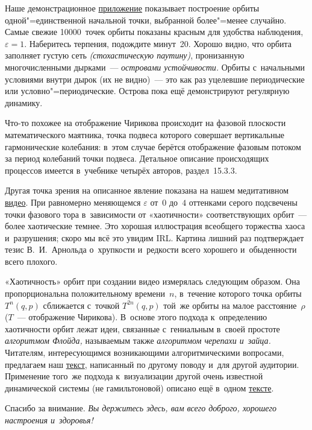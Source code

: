 \documentclass[a4paper,11pt]{article}
\theoremstyle{definition}
\begin{document}
Наше демонстрационное
\href{http://mech.math.msu.su/~shvetz/practicum/SCM.svg}{приложение} показывает
построение орбиты одной"=единственной начальной точки, выбранной более"=менее
случайно. Самые свежие 10000~точек орбиты показаны красным для удобства
наблюдения, $\varepsilon=1$. Наберитесь терпения, подождите минут~20. Хорошо
видно, что орбита заполняет густую сеть \emph{(стохастическую паутину)},
пронизанную многочисленными дырками~— \emph{островами устойчивости.} Орбиты
с~начальными условиями внутри дырок (их не видно)~— это как раз уцелевшие
периодические или условно"=периодические. Острова пока ещё демонстрируют
регулярную динамику.

Что-то похожее на отображение Чирикова происходит на фазовой плоскости
математического маятника, точка подвеса которого совершает вертикальные
гармонические колебания: в~этом случае берётся отображение фазовым потоком за
период колебаний точки подвеса. Детальное описание происходящих процессов
имеется в~учебнике четырёх авторов, раздел~15.3.3.

Другая точка зрения на описанное явление показана на нашем медитативном
\href{http://mech.math.msu.su/~shvetz/practicum/SCM.mp4}{видео}. При равномерно
меняющемся $\varepsilon$ от~$0$ до~$4$ оттенками серого подсвечены точки
фазового тора в~зависимости от «хаотичности» соответствующих орбит~— более
хаотические темнее. Это хорошая иллюстрация всеобщего торжества хаоса
и~разрушения; скоро мы всё это увидим IRL. Картина лишний раз подтверждает
тезис В.~И.~Арнольда о~хрупкости и~редкости всего хорошего и~обыденности всего
плохого.

«Хаотичность» орбит при создании видео измерялась следующим образом. Она
пропорциональна положительному времени~$n$, в~течение которого точка орбиты
$T^n(q,p)$ сближается с~точкой $T^{2n}(q,p)$ той~же орбиты на малое
расстояние~$\rho$ ($T$~— отображение Чирикова). В~основе этого подхода
к~определению хаотичности орбит лежат идеи, связанные с~гениальным в~своей
простоте \emph{алгоритмом Флойда,} называемым также \emph{алгоритмом черепахи
и~зайца.} Читателям, интересующимся возникающими алгоритмическими вопросами,
предлагаем наш
\href{http://mech.math.msu.su/~shvetz/54/inf/perl-problems/chDecimalFraction_sIdeas.xhtml#chDecimalFraction_sIdeas_sTortoiseAndHareMethod}{текст},
написанный по другому поводу и~для другой аудитории. Применение того~же подхода
к~визуализации другой очень известной динамической системы (не гамильтоновой)
описано ещё в~одном
\href{http://mech.math.msu.su/~shvetz/54/inf/perl-problems/chMandelbrotSet.xhtml}{тексте}.

\bigskip

Спасибо за внимание. \emph{Вы держитесь здесь, вам всего доброго, хорошего настроения
и~здоровья!}
\end{document}
